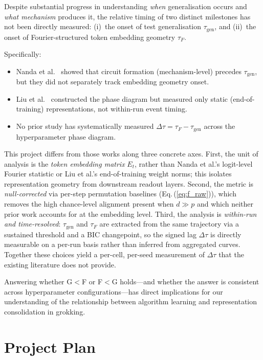 \documentclass[12pt,openany,a4paper]{book}
\newcommand{\eq}[1]  {Eq.\,(\ref{#1})}
\newcommand{\taug}{\tau_{\mathrm{gen}}}
\newcommand{\tauf}{\tau_{F}}
\newcommand{\Dtau}{\Delta\tau}
\begin{document}
Despite substantial progress in understanding \emph{when} generalisation
occurs and \emph{what mechanism} produces it, the relative timing of
two distinct milestones has not been directly measured:
(i)~the onset of test generalisation $\taug$, and
(ii)~the onset of Fourier-structured token embedding geometry $\tauf$.

Specifically:
\begin{itemize}
  \item Nanda et al.\ \cite{nanda2023progress} showed that circuit
    formation (mechanism-level) precedes $\taug$, but they did not
    separately track embedding geometry onset.
  \item Liu et al.\ \cite{liu2022towards} constructed the phase diagram
    but measured only static (end-of-training) representations, not
    within-run event timing.
  \item No prior study has systematically measured $\Dtau = \tauf - \taug$
    across the hyperparameter phase diagram.
\end{itemize}

This project differs from those works along three concrete axes.
First, the unit of analysis is the \emph{token embedding matrix} $E_t$,
rather than Nanda et al.'s logit-level Fourier statistic or Liu et al.'s
end-of-training weight norms; this isolates representation geometry
from downstream readout layers.
Second, the metric is \emph{null-corrected} via per-step permutation
baselines (\eq{eq:f_raw}), which removes the high chance-level
alignment present when $d \gg p$ and which neither prior work
accounts for at the embedding level.
Third, the analysis is \emph{within-run and time-resolved}: $\taug$
and $\tauf$ are extracted from the same trajectory via a sustained
threshold and a BIC changepoint, so the signed lag $\Dtau$ is
directly measurable on a per-run basis rather than inferred from
aggregated curves.
Together these choices yield a per-cell, per-seed measurement of
$\Dtau$ that the existing literature does not provide.

Answering whether G$<$F or F$<$G holds---and whether the answer is
consistent across hyperparameter configurations---has direct implications
for our understanding of the relationship between algorithm learning
and representation consolidation in grokking.

\chapter{Project Plan}
\label{chap:plan}
\end{document}

